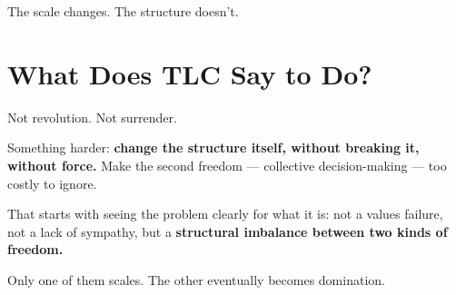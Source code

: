 \documentclass{article}
\begin{document}
The scale changes. The structure doesn't.

\section*{What Does TLC Say to Do?}

Not revolution. Not surrender.

Something harder: \textbf{change the structure itself, without breaking it, without force.}
Make the second freedom — collective decision-making — too costly to ignore.

That starts with seeing the problem clearly for what it is: not a values failure, not a lack of sympathy, but a \textbf{structural imbalance between two kinds of freedom.}

Only one of them scales. The other eventually becomes domination.
\end{document}
